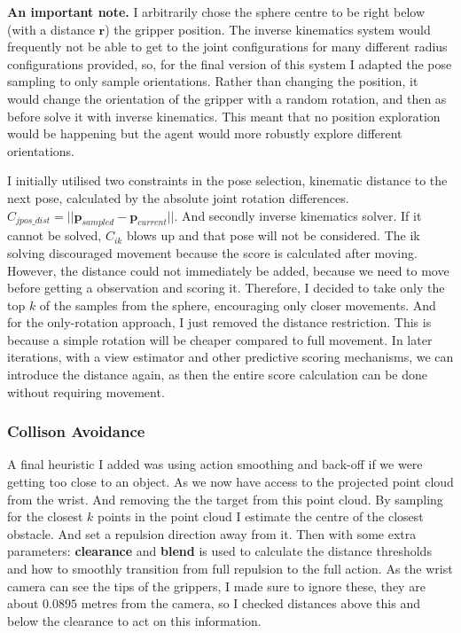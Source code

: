 \textbf{An important note.} I arbitrarily chose the sphere centre to be right below (with a distance $\mathbf{r}$) the gripper position. The inverse kinematics system would frequently not be able to get to the joint configurations for many different radius configurations provided, so, for the final version of this system I adapted the pose sampling to only sample orientations. Rather than changing the position, it would change the orientation of the gripper with a random rotation, and then as before solve it with inverse kinematics. This meant that no position exploration would be happening but the agent would more robustly explore different orientations. 

I initially utilised two constraints in the pose selection, kinematic distance to the next pose, calculated by the absolute joint rotation differences. \(C_{jpos\_dist} = ||\mathbf{p}_{sampled} - \mathbf{p}_{current}||\). And secondly inverse kinematics solver. If it cannot be solved, \(C_{ik}\) blows up and that pose will not be considered. The ik solving discouraged movement because the score is calculated after moving. However, the distance could not immediately be added, because we need to move before getting a observation and scoring it. Therefore, I decided to take only the top $k$ of the samples from the sphere, encouraging only closer movements. And for the only-rotation approach, I just removed the distance restriction. This is because a simple rotation will be cheaper compared to full movement. In later iterations, with a view estimator and other predictive scoring mechanisms, we can introduce the distance again, as then the entire score calculation can be done without requiring movement.

\subsubsection{Collison Avoidance}
A final heuristic I added was using action smoothing and back-off if we were getting too close to an object. As we now have access to the projected point cloud from the wrist. And removing the the target from this point cloud. By sampling for the closest $k$ points in the point cloud I estimate the centre of the closest obstacle. And set a repulsion direction away from it.
Then with some extra parameters: \textbf{clearance} and \textbf{blend} is used to calculate the distance thresholds and how to smoothly transition from full repulsion to the full action. As the wrist camera can see the tips of the grippers, I made sure to ignore these, they are about $0.0895$ metres from the camera, so I checked distances above this and below the clearance to act on this information.


